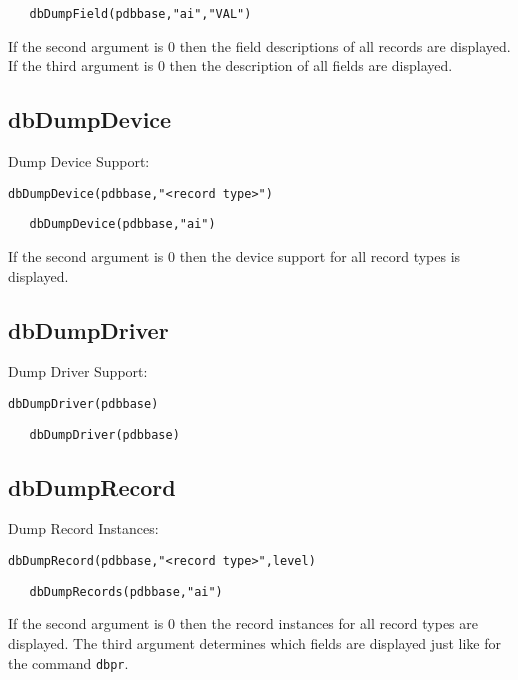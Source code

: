 \begin{verbatim}
   dbDumpField(pdbbase,"ai","VAL")
\end{verbatim}

If the second argument is 0 then the field descriptions of all records are displayed. If the third argument is 0 then the 
description of all fields are displayed.

\subsection{dbDumpDevice}

Dump Device Support:

\begin{verbatim}
dbDumpDevice(pdbbase,"<record type>")
\end{verbatim}

\begin{verbatim}
   dbDumpDevice(pdbbase,"ai")
\end{verbatim}

If the second argument is 0 then the device support for all record types is displayed.

\subsection{dbDumpDriver}

Dump Driver Support:

\begin{verbatim}
dbDumpDriver(pdbbase)
\end{verbatim}

\begin{verbatim}
   dbDumpDriver(pdbbase)
\end{verbatim}

\subsection{dbDumpRecord}

Dump Record Instances:

\begin{verbatim}
dbDumpRecord(pdbbase,"<record type>",level)
\end{verbatim}

\begin{verbatim}
   dbDumpRecords(pdbbase,"ai")
\end{verbatim}

If the second argument is 0 then the record instances for all record types are displayed. The third argument determines 
which fields are displayed just like for the command \verb|dbpr|.


